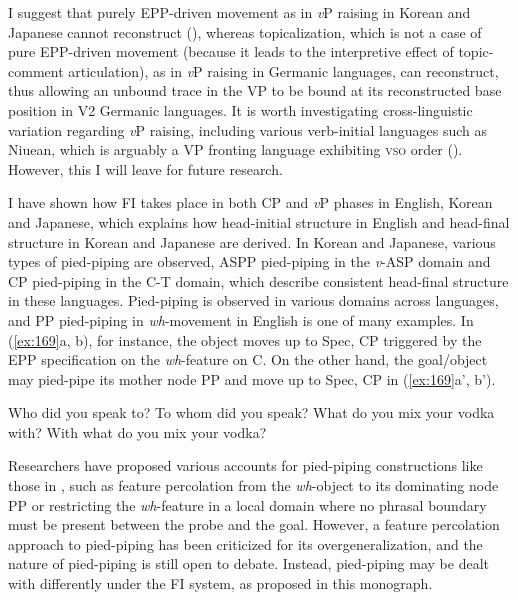 \hspace*{-1mm}I suggest that purely \ac{EPP}-driven movement as in \textit{v}P raising in Korean and Jap\-a\-nese cannot reconstruct (\citealt{NevinsAnand2003}), whereas topicalization, which is not a case of pure \ac{EPP}-driven movement (because it leads to the interpretive effect of topic-comment articulation), as in \textit{v}P raising in Germanic languages, can reconstruct, thus allowing an unbound trace in the VP to be bound at its reconstructed base position in V2 Germanic languages. It is worth investigating cross-linguistic variation regarding \textit{v}P raising, including various verb-initial languages such as Niuean, which is arguably a \ac{VP} fronting language exhibiting \textsc{vso} order (\citealt{Massam2000,Massam2001}). However, this I will leave for future research.

I have shown how \ac{FI} takes place in both \ac{CP} and \textit{v}P phases in English, Korean and Japanese, which explains how head-initial structure in English and head-final structure in Korean and Japanese are derived. In Korean and Japanese, various types of pied-piping are observed, \ac{ASP}P pied-piping in the \textit{v}{}-\ac{ASP} domain and \ac{CP} pied-piping in the C-T domain, which describe consistent head-final structure in these languages. Pied-piping is observed in various domains across languages, and PP pied-piping in \textit{wh}{}-movement in English is one of many examples. In (\ref{ex:169}a, b), for instance, the object moves up to Spec, \ac{CP} triggered by the \ac{EPP} specification on the \textit{wh}{}-feature on C. On the other hand, the goal/object may pied-pipe its mother node PP and move up to Spec, \ac{CP} in (\ref{ex:169}a', b'). 

\begin{exe}\ex\label{ex:169} 
    \begin{xlist}
    \ex\label{ex:169a} Who did you speak to?
     To whom did you speak?
    \ex\label{ex:169b} What do you mix your vodka with?
     With what do you mix your vodka?
\end{xlist}\end{exe}

Researchers have proposed various accounts for pied-piping constructions like those in , such as feature percolation from the \textit{wh}-object to its dominating node PP or restricting the \textit{wh}-feature in a local domain where no phrasal boundary must be present between the probe and the goal. However, a feature percolation approach to pied-piping has been criticized for its overgeneralization, and the nature of pied-piping is still open to debate. Instead, pied-piping may be dealt with differently under the \ac{FI} system, as proposed in this monograph. 

